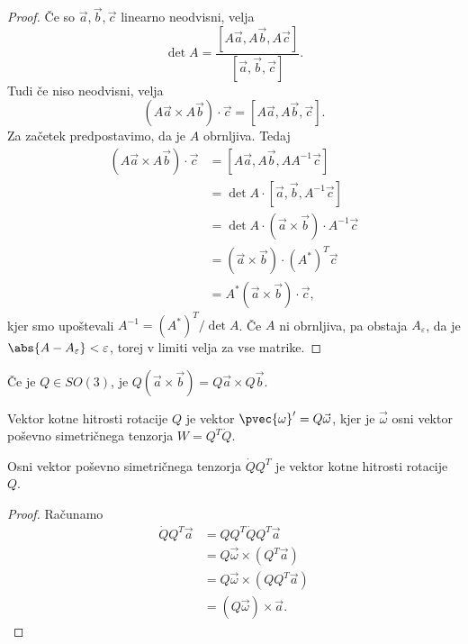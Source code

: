 \begin{proof}
  Če so $\vec{a}, \vec{b}, \vec{c}$ linearno neodvisni, velja
  \[
	\det A = \frac{[A\vec{a}, A\vec{b}, A\vec{c}]}{[\vec{a}, \vec{b}, \vec{c}]}.
  \]
  Tudi če niso neodvisni, velja
  \[
	(A\vec{a} \times A\vec{b}) \cdot \vec{c}
	= [A \vec{a}, A \vec{b}, \vec{c}].
  \]
  Za začetek predpostavimo, da je $A$ obrnljiva.
  Tedaj
  \begin{align*}
	(A\vec{a} \times A\vec{b}) \cdot \vec{c}
	&= [A \vec{a}, A \vec{b}, A A^{-1} \vec{c}] \\
	&= \det A \cdot [\vec{a}, \vec{b}, A^{-1} \vec{c}] \\
	&= \det A \cdot (\vec{a} \times \vec{b}) \cdot A^{-1} \vec{c} \\
	&= (\vec{a} \times \vec{b}) \cdot (A^*)^T \vec{c} \\
	&= A^* (\vec{a} \times \vec{b}) \cdot \vec{c},
  \end{align*}
  kjer smo upoštevali $A^{-1} = (A^*)^T / \det A$.
  Če $A$ ni obrnljiva, pa obstaja $A_\varepsilon$, da je $\abs{A -
	A_\varepsilon} < \varepsilon$, torej v limiti velja za vse matrike.
\end{proof}

\begin{posledica}
  Če je $Q \in SO(3)$, je $Q(\vec{a} \times \vec{b}) = Q\vec{a} \times Q\vec{b}$.
\end{posledica}


\begin{definicija}
  Vektor kotne hitrosti rotacije $Q$ je vektor $\pvec{\omega}' = Q
  \vec{\omega}$, kjer je $\vec{\omega}$ osni vektor poševno simetričnega
  tenzorja $W = Q^T \dot{Q}$.
\end{definicija}

\begin{trditev}
  Osni vektor poševno simetričnega tenzorja $\dot{Q} Q^T$ je vektor kotne
  hitrosti rotacije $Q$.
\end{trditev}

\begin{proof}
  Računamo
  \begin{align*}
	\dot{Q} Q^T \vec{a}
	&= Q Q^T \dot{Q} Q^T \vec{a} \\
	&= Q \vec{\omega} \times (Q^T \vec{a}) \\
	&= Q \vec{\omega} \times (Q Q^T \vec{a}) \\
	&= (Q \vec{\omega}) \times \vec{a}.
  \end{align*}
\end{proof}

